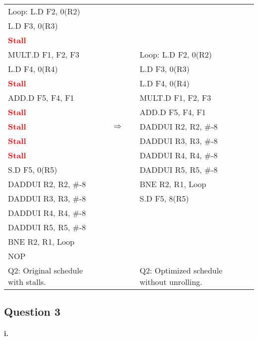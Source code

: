\documentclass[11pt]{article}
\newcommand{\q}[1]{\subsection*{Question {#1}}}
\renewcommand{\part}[1]{\paragraph*{{#1}.}}
\newcommand{\code}[1]{\textsf{#1}}
\newcommand{\stall}{\textcolor{red}{\textbf{Stall}}}
\begin{document}
\begin{table}[h]
\begin{tabular}{lcccl}
	  \code{Loop:} \code{L.D F2, 0(R2)} & & & & \\
	 \code{L.D F3, 0(R3)} & & & & \\
	 \stall & & & &\\
	 \code{MULT.D F1, F2, F3} & & & &  \code{Loop:} \code{L.D F2, 0(R2)} \\
	 \code{L.D F4, 0(R4)} & & & & \code{L.D F3, 0(R3)} \\
	 \stall & & & & \code{L.D F4, 0(R4)} \\
	 \code{ADD.D F5, F4, F1} & & & & \code{MULT.D F1, F2, F3} \\
	 \stall & & & & \code{ADD.D F5, F4, F1} \\
	 \stall & & $\Rightarrow$ & & \code{DADDUI R2, R2, \#-8} \\
	 \stall & & & & \code{DADDUI R3, R3, \#-8} \\
	 \stall & & & & \code{DADDUI R4, R4, \#-8} \\
	 \code{S.D F5, 0(R5)} & & & & \code{DADDUI R5, R5, \#-8} \\
	 \code{DADDUI R2, R2, \#-8} & & & & \code{BNE R2, R1, Loop} \\
	 \code{DADDUI R3, R3, \#-8} & & & & \code{S.D F5, 8(R5)} \\
	 \code{DADDUI R4, R4, \#-8} & & & &\\
	 \code{DADDUI R5, R5, \#-8} & & & & \\
	 \code{BNE R2, R1, Loop} & & & &\\
	 \code{NOP} & & & &\\
	 Q2: Original schedule with stalls. & & & & Q2: Optimized schedule without unrolling.
\end{tabular}
\label{tbl:q2}
\end{table}


\q{3} 
\part{i} 
\end{document}
